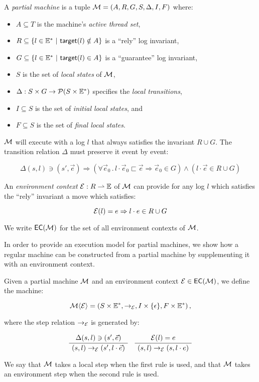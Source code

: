 \begin{definition}
\label{def:partialm}
A \emph{partial machine} is a tuple $\mathcal{M} = (A, R, G, S, \Delta, I, F)$
where:
\begin{itemize}
\item
$A \subseteq T$ is the machine's \emph{active thread set},
\item
$R \subseteq \{ l \in \Ev^* \ |\ \kw{target}(l) \notin A \}$ is a ``rely'' log invariant,
\item
$G \subseteq \{ l \in \Ev^* \ |\ \kw{target}(l) \in A \}$ is a ``guarantee'' log invariant,
\item
$S$ is the set of \emph{local states} of $\mathcal{M}$,
\item
$\Delta : S \times G \rightarrow \mathcal{P}(S \times \mathbb{E}^*)$
specifies the \emph{local transitions},
\item
$I \subseteq S$ is the set of \emph{initial local states}, and
\item
$F \subseteq S$ is the set of \emph{final local states}.
\end{itemize}
$\mathcal{M}$ will execute with a log $l$ that always satisfies the invariant $R \cup G$.
The transition relation $\Delta$ must preserve it event by event:
\begin{small}
\[ \Delta(s, l) \ni (s', \vec{e}) \Rightarrow (\forall \vec{e}_0 \,.\, l \cdot \vec{e}_0 \sqsubset \vec{e} \Rightarrow \vec{e}_0 \in G) \wedge (l \cdot \vec{e} \in R \cup G) \]
\end{small}%
An \emph{environment context} $\mathcal{E} : R \rightharpoonup \mathbb{E}$
of $\mathcal{M}$ can provide for any log $l$
which satisfies the ``rely'' invariant
a move which satisfies:
\begin{small}
\[ \mathcal{E}(l) = e \Rightarrow l \cdot e \in R \cup G \]
\end{small}%
We write ${{\mathsf{EC}}({\mathcal{M}})}$ for the set of all environment contexts of $\mathcal{M}$.
\end{definition}

In order to provide an execution model for partial machines,
we show how a regular machine can be constructed
from a partial machine
by supplementing it with an environment context.

\begin{definition}
Given a partial machine $\mathcal{M}$ and an environment context $\mathcal{E} \in {{\mathsf{EC}}({\mathcal{M}})}$,
we define the machine:
\begin{small}
\[ \mathcal{M} \langle \mathcal{E} \rangle =
	(S \times \mathbb{E}^*, \rightarrow_{\mathcal{E}}, I \times \{\epsilon\}, F \times \mathbb{E}^*) \,, \]
\end{small}
where the step relation $\rightarrow_{\mathcal{E}}$ is generated by:
\begin{small}
\[
	\AxiomC{$\Delta(s, l) \ni (s', \vec{e})$}
	\UnaryInfC{$(s, l) \rightarrow_\Env (s', l \cdot \vec{e})$}
	\DisplayProof
	\quad
	\AxiomC{$\Env(l) = e$}
	\UnaryInfC{$(s, l) \rightarrow_\Env (s, l \cdot e)$}
	\DisplayProof
\]
\end{small}%
We say that $\mathcal{M}$ takes a local step when the first rule is used,
and that $\mathcal{M}$ takes an environment step when the second rule is used.
\end{definition}

